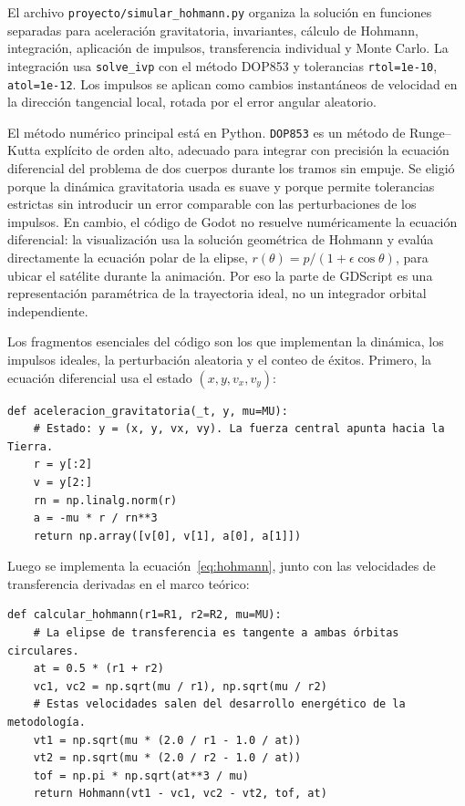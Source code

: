 \documentclass[12pt]{article}
\begin{document}
El archivo \texttt{proyecto/simular\_hohmann.py} organiza la solución en
funciones separadas para aceleración gravitatoria, invariantes, cálculo de
Hohmann, integración, aplicación de impulsos, transferencia individual y Monte
Carlo. La integración usa \texttt{solve\_ivp} con el método DOP853 y tolerancias
\texttt{rtol=1e-10}, \texttt{atol=1e-12}. Los impulsos se aplican como cambios
instantáneos de velocidad en la dirección tangencial local, rotada por el error
angular aleatorio.

El método numérico principal está en Python. \texttt{DOP853} es un método de
Runge--Kutta explícito de orden alto, adecuado para integrar con precisión la
ecuación diferencial del problema de dos cuerpos durante los tramos sin empuje.
Se eligió porque la dinámica gravitatoria usada es suave y porque permite
tolerancias estrictas sin introducir un error comparable con las perturbaciones
de los impulsos. En cambio, el código de Godot no resuelve numéricamente la
ecuación diferencial: la visualización usa la solución geométrica de Hohmann y
evalúa directamente la ecuación polar de la elipse,
$r(\theta)=p/(1+\epsilon\cos\theta)$, para ubicar el satélite durante la
animación.
Por eso la parte de GDScript es una representación paramétrica de la trayectoria
ideal, no un integrador orbital independiente.

Los fragmentos esenciales del código son los que implementan la dinámica, los
impulsos ideales, la perturbación aleatoria y el conteo de éxitos. Primero, la
ecuación diferencial usa el estado $(x,y,v_x,v_y)$:

\begin{Verbatim}[fontsize=\footnotesize]
def aceleracion_gravitatoria(_t, y, mu=MU):
    # Estado: y = (x, y, vx, vy). La fuerza central apunta hacia la Tierra.
    r = y[:2]
    v = y[2:]
    rn = np.linalg.norm(r)
    a = -mu * r / rn**3
    return np.array([v[0], v[1], a[0], a[1]])
\end{Verbatim}

Luego se implementa la ecuación~\eqref{eq:hohmann}, junto con las velocidades
de transferencia derivadas en el marco teórico:

\begin{Verbatim}[fontsize=\footnotesize]
def calcular_hohmann(r1=R1, r2=R2, mu=MU):
    # La elipse de transferencia es tangente a ambas órbitas circulares.
    at = 0.5 * (r1 + r2)
    vc1, vc2 = np.sqrt(mu / r1), np.sqrt(mu / r2)
    # Estas velocidades salen del desarrollo energético de la metodología.
    vt1 = np.sqrt(mu * (2.0 / r1 - 1.0 / at))
    vt2 = np.sqrt(mu * (2.0 / r2 - 1.0 / at))
    tof = np.pi * np.sqrt(at**3 / mu)
    return Hohmann(vt1 - vc1, vc2 - vt2, tof, at)
\end{Verbatim}
\end{document}
